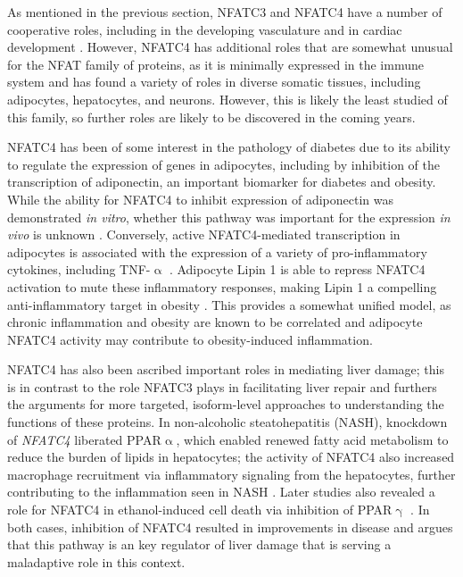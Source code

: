 As mentioned in the previous section, NFATC3 and NFATC4 have a number of cooperative roles, including in the developing vasculature and in cardiac development \citep{Graef2001, Bushdid2003}. However, NFATC4 has additional roles that are somewhat unusual for the NFAT family of proteins, as it is minimally expressed in the immune system and has found a variety of roles in diverse somatic tissues, including adipocytes, hepatocytes, and neurons. However, this is likely the least studied of this family, so further roles are likely to be discovered in the coming years.

NFATC4 has been of some interest in the pathology of diabetes due to its ability to regulate the expression of genes in adipocytes, including by inhibition of the transcription of adiponectin, an important biomarker for diabetes and obesity. While the ability for NFATC4 to inhibit expression of adiponectin was demonstrated \textit{in vitro}, whether this pathway was important for the expression \textit{in vivo} is unknown \citep{Kim2006}. Conversely, active NFATC4\hyp{}mediated transcription in adipocytes is associated with the expression of a variety of pro\hyp{}inflammatory cytokines, including TNF\hyp{}$\upalpha$ \citep{Kim2008}. Adipocyte Lipin 1 is able to repress NFATC4 activation to mute these inflammatory responses, making Lipin 1 a compelling anti-inflammatory target in obesity \citep{Kim2010}. This provides a somewhat unified model, as chronic inflammation and obesity are known to be correlated and adipocyte NFATC4 activity may contribute to obesity-induced inflammation. 

NFATC4 has also been ascribed important roles in mediating liver damage; this is in contrast to the role NFATC3 plays in facilitating liver repair and furthers the arguments for more targeted, isoform\hyp{}level approaches to understanding the functions of these proteins. In non\hyp{}alcoholic steatohepatitis (NASH), knockdown of \textit{NFATC4} liberated PPAR$\upalpha$, which enabled renewed fatty acid metabolism to reduce the burden of lipids in hepatocytes; the activity of NFATC4 also increased macrophage recruitment via inflammatory signaling from the hepatocytes, further contributing to the inflammation seen in NASH \citep{Du2020}. Later studies also revealed a role for NFATC4 in ethanol\hyp{}induced cell death via inhibition of PPAR$\upgamma$ \citep{Wu2021}. In both cases, inhibition of NFATC4 resulted in improvements in disease and argues that this pathway is an key regulator of liver damage that is serving a maladaptive role in this context.

